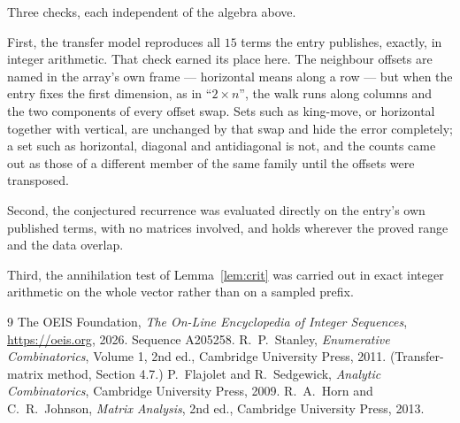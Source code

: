\documentclass[11pt,a4paper]{article}
\theoremstyle{plain}
\theoremstyle{definition}
\begin{document}
Three checks, each independent of the algebra above.

First, the transfer model reproduces all $15$ terms the entry publishes, exactly, in
integer arithmetic. That check earned its place here. The neighbour offsets are named in the
array's own frame --- horizontal means along a row --- but when the entry fixes the first
dimension, as in ``$2\times n$'', the walk runs along columns and the two components of every
offset swap. Sets such as king-move, or horizontal together with vertical, are unchanged by
that swap and hide the error completely; a set such as horizontal, diagonal and antidiagonal
is not, and the counts came out as those of a different member of the same family until the
offsets were transposed.

Second, the conjectured recurrence was evaluated directly on the entry's own published terms,
with no matrices involved, and holds wherever the proved range and the data overlap.

Third, the annihilation test of Lemma~\ref{lem:crit} was carried out in exact integer
arithmetic on the whole vector rather than on a sampled prefix.

\begin{thebibliography}{9}
 The OEIS Foundation, \emph{The On-Line Encyclopedia of Integer
Sequences}, \url{https://oeis.org}, 2026. Sequence A205258.
 R.~P.~Stanley, \emph{Enumerative Combinatorics}, Volume 1, 2nd ed.,
Cambridge University Press, 2011. (Transfer-matrix method, Section 4.7.)
 P.~Flajolet and R.~Sedgewick, \emph{Analytic Combinatorics}, Cambridge
University Press, 2009.
 R.~A.~Horn and C.~R.~Johnson, \emph{Matrix Analysis}, 2nd ed., Cambridge
University Press, 2013.
\end{thebibliography}
\end{document}
